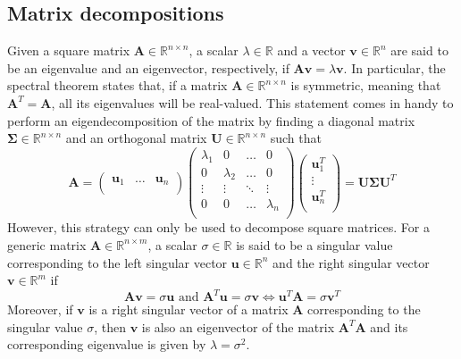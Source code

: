 \documentclass{report}
\begin{document}
\subsection{Matrix decompositions}
Given a square matrix $\displaystyle \mathbf{A} \in \mathbb{R}^{n \times n}$, a scalar $\displaystyle \lambda \in \mathbb{R}$ and a vector $\displaystyle \mathbf{v} \in \mathbb{R}^n$ are said to be an eigenvalue and an eigenvector, respectively, if $\displaystyle \mathbf{Av} = \lambda\mathbf{v}$. \newline
In particular, the spectral theorem states that, if a matrix $\displaystyle \mathbf{A} \in \mathbb{R}^{n \times n}$ is symmetric, meaning that $\displaystyle \mathbf{A}^T = \mathbf{A}$, all its eigenvalues will be real-valued. \newline
This statement comes in handy to perform an eigendecomposition of the matrix by finding a diagonal matrix $\displaystyle \mathbf{\Sigma} \in \mathbb{R}^{n \times n}$ and an orthogonal matrix $\displaystyle \mathbf{U} \in \mathbb{R}^{n \times n}$ such that
\[\mathbf{A} = \begin{pmatrix}
    \mathbf{u}_1 & \dots & \mathbf{u}_n \\
\end{pmatrix}\begin{pmatrix}
    \lambda_1 & 0 & \dots & 0 \\
    0 & \lambda_2 & \dots & 0 \\
    \vdots & \vdots & \ddots & \vdots \\
    0 & 0 & \dots & \lambda_n \\
\end{pmatrix}\begin{pmatrix}
    \mathbf{u}_1^T \\
    \vdots \\
    \mathbf{u}_n^T \\
\end{pmatrix} = \mathbf{U\Sigma U}^T\]
However, this strategy can only be used to decompose square matrices. \newline
For a generic matrix $\displaystyle \mathbf{A} \in \mathbb{R}^{n \times m}$, a scalar $\displaystyle \sigma \in \mathbb{R}$ is said to be a singular value corresponding to the left singular vector $\displaystyle \mathbf{u} \in \mathbb{R}^n$ and the right singular vector $\displaystyle \mathbf{v} \in \mathbb{R}^m$ if
\[\mathbf{Av} = \sigma\mathbf{u} \text{ and } \mathbf{A}^T\mathbf{u} = \sigma\mathbf{v} \Leftrightarrow \mathbf{u}^T\mathbf{A} = \sigma\mathbf{v}^T\]
Moreover, if $\displaystyle \mathbf{v}$ is a right singular vector of a matrix $\displaystyle \mathbf{A}$ corresponding to the singular value $\displaystyle \sigma$, then $\displaystyle \mathbf{v}$ is also an eigenvector of the matrix $\displaystyle \mathbf{A}^T\mathbf{A}$ and its corresponding eigenvalue is given by $\displaystyle \lambda = \sigma^2$.
\end{document}

